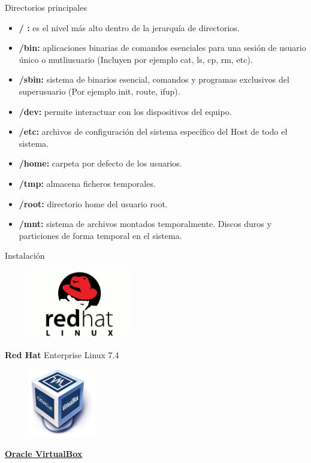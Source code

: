 \documentclass{beamer}
\begin{document}
\begin{frame}{Directorios principales}
\begin{itemize}
\item \textbf{/ :} es el nivel más alto dentro de la jerarquía de directorios.
\item \textbf{/bin:} aplicaciones binarias de comandos esenciales para una sesión de usuario único o mutliusuario (Incluyen por ejemplo cat, ls, cp, rm, etc).
\item \textbf{/sbin: }sistema de binarios esencial, comandos y programas exclusivos del superusuario (Por ejemplo init, route, ifup).
\item \textbf{/dev:} permite interactuar con los dispositivos del equipo.
\item \textbf{/etc:} archivos de configuración del sistema específico del Host de todo el sistema. 
\item \textbf{/home:} carpeta por defecto de los usuarios.
\item \textbf{/tmp:} almacena ficheros temporales.
\item \textbf{/root:} directorio home del usuario root. 
\item \textbf{/mnt:} sistema de archivos montados temporalmente. Discos duros y particiones de forma temporal en el sistema.
\end{itemize}
\end{frame}
\begin{frame}{Instalación}
\begin{multicols}{2}
\centering
\begin{figure}
	\includegraphics[height=3cm]{img/rhel.png}
\end{figure}
\textbf{Red Hat} Enterprise Linux 7.4
\begin{figure}
	\includegraphics[height=3cm]{img/Virtualbox.png}
\end{figure}
\textbf{ \href{https://download.virtualbox.org/virtualbox/6.0.4/VirtualBox-6.0.4-128413-Win.exe}{Oracle VirtualBox}}

\end{multicols}

\end{frame}
\end{document}
